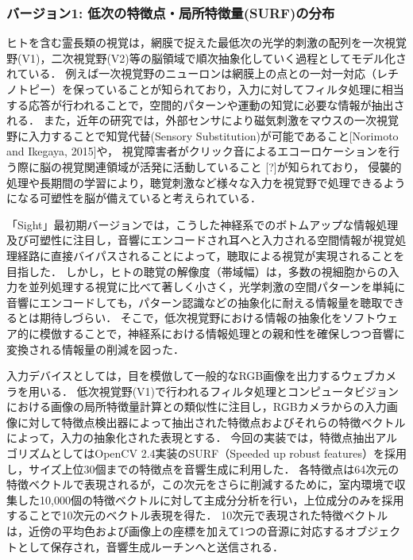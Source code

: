 \subsubsection{バージョン1: 低次の特徴点・局所特徴量(SURF)の分布}

ヒトを含む霊長類の視覚は，網膜で捉えた最低次の光学的刺激の配列を一次視覚野(V1)，二次視覚野(V2)等の脳領域で順次抽象化していく過程としてモデル化されている．
例えば一次視覚野のニューロンは網膜上の点との一対一対応（レチノトピー）を保っていることが知られており，入力に対してフィルタ処理に相当する応答が行われることで，空間的パターンや運動の知覚に必要な情報が抽出される．
また，近年の研究では，外部センサにより磁気刺激をマウスの一次視覚野に入力することで知覚代替(Sensory Substitution)が可能であること[Norimoto and Ikegaya, 2015]や，
視覚障害者がクリック音によるエコーロケーションを行う際に脳の視覚関連領域が活発に活動していること
[?]が知られており，
侵襲的処理や長期間の学習により，聴覚刺激など様々な入力を視覚野で処理できるようになる可塑性を脳が備えていると考えられている．

「Sight」最初期バージョンでは，こうした神経系でのボトムアップな情報処理及び可塑性に注目し，音響にエンコードされ耳へと入力される空間情報が視覚処理経路に直接バイパスされることによって，聴取による視覚が実現されることを目指した．
しかし，ヒトの聴覚の解像度（帯域幅）は，多数の視細胞からの入力を並列処理する視覚に比べて著しく小さく，光学刺激の空間パターンを単純に音響にエンコードしても，パターン認識などの抽象化に耐える情報量を聴取できるとは期待しづらい．
そこで，低次視覚野における情報の抽象化をソフトウェア的に模倣することで，神経系における情報処理との親和性を確保しつつ音響に変換される情報量の削減を図った．

入力デバイスとしては，目を模倣して一般的なRGB画像を出力するウェブカメラを用いる．
低次視覚野(V1)で行われるフィルタ処理とコンピュータビジョンにおける画像の局所特徴量計算との類似性に注目し，RGBカメラからの入力画像に対して特徴点検出器によって抽出された特徴点およびそれらの特徴ベクトルによって，入力の抽象化された表現とする．
今回の実装では，特徴点抽出アルゴリズムとしてはOpenCV 2.4実装のSURF（Speeded up robust features）を採用し，サイズ上位30個までの特徴点を音響生成に利用した．
各特徴点は64次元の特徴ベクトルで表現されるが，この次元をさらに削減するために，室内環境で収集した10,000個の特徴ベクトルに対して主成分分析を行い，上位成分のみを採用することで10次元のベクトル表現を得た．
10次元で表現された特徴ベクトルは，近傍の平均色および画像上の座標を加えて1つの音源に対応するオブジェクトとして保存され，音響生成ルーチンへと送信される．


